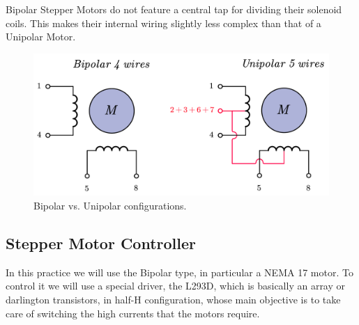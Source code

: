 \documentclass[a4paper, 11pt, oneside]{article}
\begin{document}
Bipolar Stepper Motors do not feature a central tap for dividing their solenoid coils. This makes their internal wiring slightly less complex than that of a Unipolar Motor.

\vspace{0.3cm}

\begin{figure}[H]
    \centering
    \includegraphics[scale = 0.24]{Graphics/Practice 3/GRAPHICS/STEPPER_TYPES.pdf}
    \caption{Bipolar vs. Unipolar configurations.}
    \label{fig:STEPPER_TYPE}
\end{figure}

\clearpage

\subsection{Stepper Motor Controller}

In this practice we will use the Bipolar type, in particular a NEMA 17 motor. To control it we will use a special driver, the L293D, which is basically an array or darlington transistors, in half-H configuration,  whose main objective is to take care of switching the high currents that the motors require. 

\vspace{0.3cm}
\end{document}
